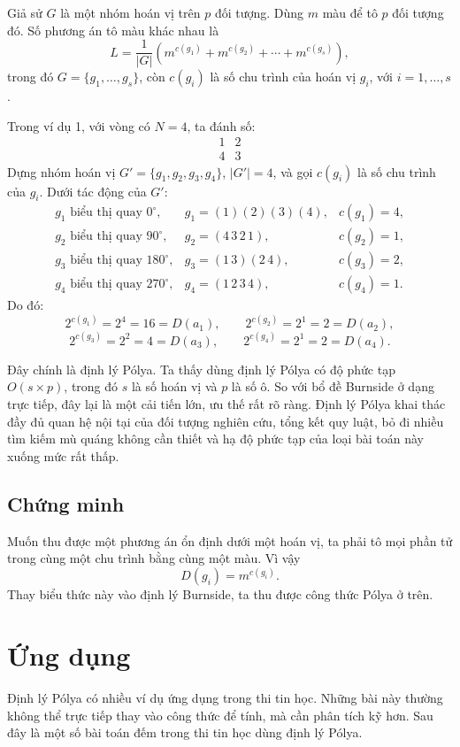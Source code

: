 \documentclass[11pt]{article}
\begin{document}
Giả sử \(G\) là một nhóm hoán vị trên \(p\) đối tượng. Dùng \(m\) màu để tô
\(p\) đối tượng đó. Số phương án tô màu khác nhau là
\[
  L=\frac{1}{|G|}
    \left(m^{c(g_1)}+m^{c(g_2)}+\cdots+m^{c(g_s)}\right),
\]
trong đó \(G=\{g_1,\ldots,g_s\}\), còn \(c(g_i)\) là số chu trình của hoán vị
\(g_i\), với \(i=1,\ldots,s\).

Trong ví dụ 1, với vòng có \(N=4\), ta đánh số:
\[
\begin{array}{cc}
1&2\\
4&3
\end{array}
\]
Dựng nhóm hoán vị \(G'=\{g_1,g_2,g_3,g_4\}\), \(|G'|=4\), và gọi \(c(g_i)\)
là số chu trình của \(g_i\). Dưới tác động của \(G'\):
\[
\begin{array}{lll}
g_1\text{ biểu thị quay }0^\circ,   & g_1=(1)(2)(3)(4), & c(g_1)=4,\\
g_2\text{ biểu thị quay }90^\circ,  & g_2=(4\,3\,2\,1), & c(g_2)=1,\\
g_3\text{ biểu thị quay }180^\circ, & g_3=(1\,3)(2\,4), & c(g_3)=2,\\
g_4\text{ biểu thị quay }270^\circ, & g_4=(1\,2\,3\,4), & c(g_4)=1.
\end{array}
\]
Do đó:
\[
  2^{c(g_1)}=2^4=16=D(a_1),\qquad
  2^{c(g_2)}=2^1=2=D(a_2),
\]
\[
  2^{c(g_3)}=2^2=4=D(a_3),\qquad
  2^{c(g_4)}=2^1=2=D(a_4).
\]

Đây chính là định lý Pólya. Ta thấy dùng định lý Pólya có độ phức tạp
\(O(s\times p)\), trong đó \(s\) là số hoán vị và \(p\) là số ô. So với bổ đề
Burnside ở dạng trực tiếp, đây lại là một cải tiến lớn, ưu thế rất rõ ràng.
Định lý Pólya khai thác đầy đủ quan hệ nội tại của đối tượng nghiên cứu, tổng
kết quy luật, bỏ đi nhiều tìm kiếm mù quáng không cần thiết và hạ độ phức tạp
của loại bài toán này xuống mức rất thấp.

\subsection{Chứng minh}

Muốn thu được một phương án ổn định dưới một hoán vị, ta phải tô mọi phần tử
trong cùng một chu trình bằng cùng một màu. Vì vậy
\[
  D(g_i)=m^{c(g_i)}.
\]
Thay biểu thức này vào định lý Burnside, ta thu được công thức Pólya ở trên.

\section{Ứng dụng}

Định lý Pólya có nhiều ví dụ ứng dụng trong thi tin học. Những bài này thường
không thể trực tiếp thay vào công thức để tính, mà cần phân tích kỹ hơn. Sau
đây là một số bài toán đếm trong thi tin học dùng định lý Pólya.
\end{document}
